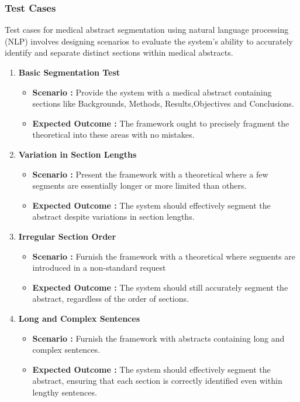 \documentclass[12pt,a4paper]{report}     %
\begin{document}
\begin{normalsize}
{{{\subsubsection{Test Cases}
Test cases for medical abstract segmentation using natural language processing (NLP) involves designing scenarios to evaluate the system's ability to accurately identify and separate distinct sections within medical abstracts.
\begin{enumerate}
    \item \textbf{Basic Segmentation Test}\begin{itemize}
        \item \textbf{Scenario :} Provide the system with a medical abstract containing sections like Backgrounds, Methods, Results,Objectives and Conclusions.
        \item \textbf{Expected Outcome :} The framework ought to precisely fragment the theoretical into these areas with no mistakes.
    \end{itemize}
    \item \textbf{Variation in Section Lengths}\begin{itemize}
        \item \textbf{Scenario :} Present the framework with a theoretical where a few segments are essentially longer or more limited than others.
        \item \textbf{Expected Outcome :} The system should effectively segment the abstract despite variations in section lengths.
    \end{itemize}
    \item \textbf{Irregular Section Order}\begin{itemize}
        \item \textbf{Scenario :} Furnish the framework with a theoretical where segments are introduced in a non-standard request
        \item \textbf{Expected Outcome :} The system should still accurately segment the abstract, regardless of the order of sections.
    \end{itemize}
    \item \textbf{Long and Complex Sentences}\begin{itemize}
        \item \textbf{Scenario :} Furnish the framework with abstracts containing long and complex sentences.
        \item \textbf{Expected Outcome :} The system should effectively segment the abstract, ensuring that each section is correctly identified even within lengthy sentences.

\end{itemize}
\end{enumerate}}}}
\end{normalsize}
\end{document}
